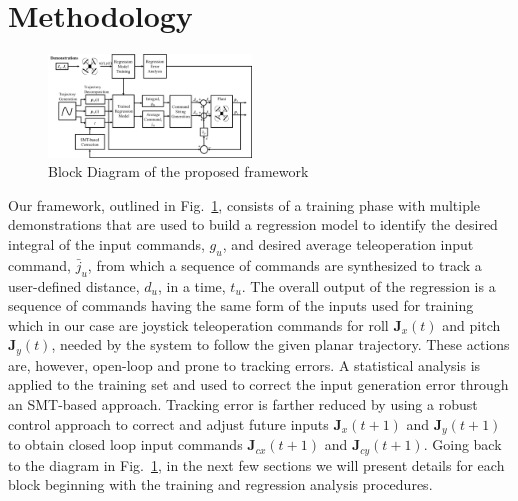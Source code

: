 \documentclass[letterpaper, 10 pt, conference]{ieeeconf}  %
\newcommand\NB[1]{$\spadesuit$\footnote{NB: #1}}
\begin{document}
\section{Methodology} \label{sec:approach}
\begin{figure}[ht]
    \includegraphics[width=0.48\textwidth]{images/blocks4.png}
    \caption{Block Diagram of the proposed framework}
    \label{fig:blockdiagram}
\end{figure}
Our framework, outlined in Fig.~\ref{fig:blockdiagram}, consists of a training phase with multiple demonstrations that are used to build a regression model to identify the desired integral of the input commands, $g_u$, and desired average teleoperation input command, $\bar{j}_u$, from which a sequence of commands are synthesized to track a user-defined distance, $d_u$, in a time, $t_u$. The overall output of the regression is a sequence of commands having the same form of the inputs used for training which in our case are joystick teleoperation commands for roll $\bm{J}_x(t)$ and pitch $\bm{J}_y(t)$, needed by the system to follow the given planar trajectory. 
These actions are, however, open-loop and prone to tracking errors. A statistical analysis is applied to the training set and used to correct the input generation error through an SMT-based approach. Tracking error is farther reduced by using a robust control approach to correct and adjust future inputs $\bm{J}_x(t+1)$ and $\bm{J}_y(t+1)$ to obtain closed loop input commands $\bm{J}_{cx}(t+1)$ and $\bm{J}_{cy}(t+1)$. Going back to the diagram in Fig.~\ref{fig:blockdiagram}, in the next few sections we will present details for each block beginning with the training and regression analysis procedures.
%
 

\end{document}
